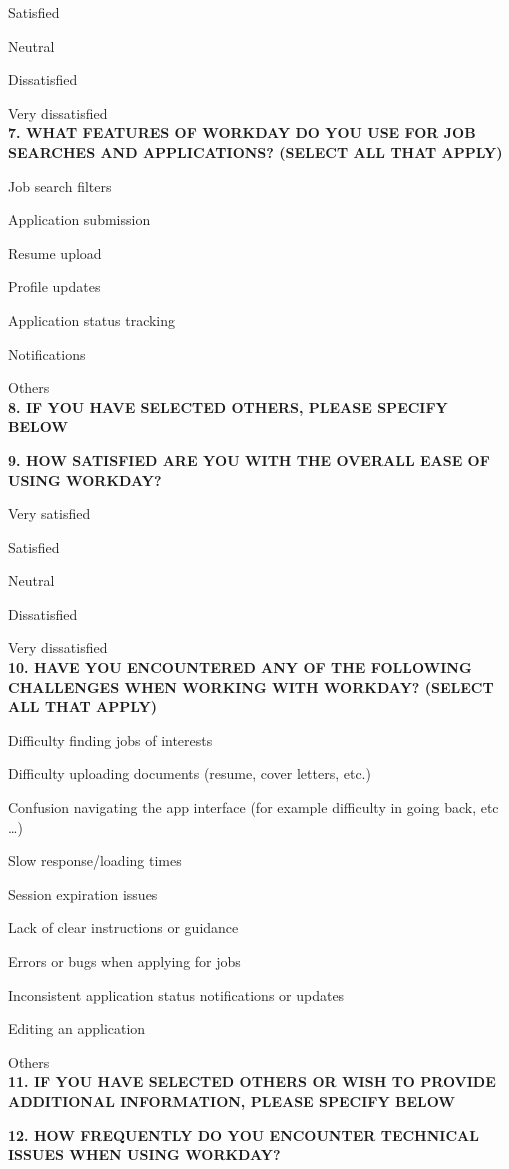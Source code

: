\documentclass[
	letterpaper, %
]{jdf}
\begin{document}
Satisfied

Neutral

Dissatisfied

Very dissatisfied \\

\textbf{7. WHAT FEATURES OF WORKDAY DO YOU USE FOR JOB SEARCHES AND APPLICATIONS? (SELECT ALL THAT APPLY) }

Job search filters

Application submission

Resume upload

Profile updates

Application status tracking

Notifications

Others \\

\textbf{8. IF YOU HAVE SELECTED OTHERS, PLEASE SPECIFY BELOW
}

\textbf{9. HOW SATISFIED ARE YOU WITH THE OVERALL EASE OF USING WORKDAY?}

Very satisfied

Satisfied

Neutral

Dissatisfied

Very dissatisfied \\

\textbf{10. HAVE YOU ENCOUNTERED ANY OF THE FOLLOWING CHALLENGES WHEN WORKING WITH WORKDAY? (SELECT ALL THAT APPLY)
}

Difficulty finding jobs of interests

Difficulty uploading documents (resume, cover letters, etc.)

Confusion navigating the app interface (for example difficulty in going back, etc …)

Slow response/loading times

Session expiration issues

Lack of clear instructions or guidance

Errors or bugs when applying for jobs

Inconsistent application status notifications or updates

Editing an application

Others \\

\textbf{11. IF YOU HAVE SELECTED OTHERS OR WISH TO PROVIDE ADDITIONAL INFORMATION, PLEASE SPECIFY BELOW} 

\textbf{12. HOW FREQUENTLY DO YOU ENCOUNTER TECHNICAL ISSUES WHEN USING WORKDAY? 
}
\end{document}
